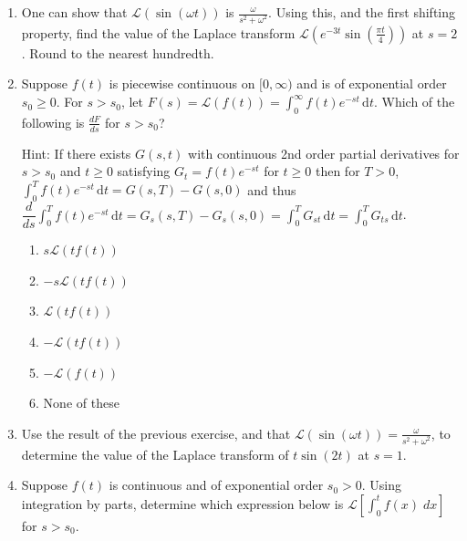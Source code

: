 \documentclass{ximera}
\newcommand{\Laplace}[1]{\ensuremath{\mathcal{L}{\left[#1\right]}}}
\begin{document}
\begin{enumerate}[label=(\arabic*)]
\item  One can show that $\mathcal{L}\left(\sin{(\omega t)}\right)$ is $\displaystyle \frac{\omega}{s^2+\omega^2}$.   Using this, and the first shifting property, find the value of the Laplace transform $\mathcal{L}\left(e^{-3t}\sin{\left(\frac{\pi t}{4}\right)}\right)$ at $s=2$.  Round to the nearest hundredth.


\newpage

\item Suppose $f(t)$ is piecewise continuous on $[0,\infty)$ and is of exponential order $s_0\geq 0$.  For $s>s_0$, let $\displaystyle F(s)=\mathcal{L}(f(t))=\int_0^{\infty} f(t)e^{-st}\,\mathrm{d}t$.   Which of the following is $\displaystyle \frac{dF}{ds}$ for $s>s_0$? 


    Hint:  If there exists $G(s,t)$ with continuous 2nd order partial derivatives for $s>s_0$ and $t\geq 0$ satisfying $G_t=f(t)e^{-st}$ for $t\geq 0$ then for $T>0$, $\displaystyle \int_0^{T} f(t)e^{-st}\,\mathrm{d}t=G(s,T)-G(s,0)$ and thus \\$\displaystyle \dfrac{d}{ds}\displaystyle \int_0^{T} f(t)e^{-st}\,\mathrm{d}t=G_s(s,T)-G_s(s,0)=\int_0^T G_{st}\,\mathrm{d}t=\int_0^T G_{ts}\,\mathrm{d}t$.


\begin{enumerate}[label=(\alph*)]
\item $\displaystyle s\mathcal{L}(tf(t))$
\item $\displaystyle -s\mathcal{L}(tf(t))$
\item $\displaystyle \mathcal{L}(tf(t))$
\item $\displaystyle -\mathcal{L}(tf(t))$ %
\item $\displaystyle -\mathcal{L}(f(t))$
\item None of these
\end{enumerate}



\item  Use the result of the previous exercise, and that $\displaystyle \mathcal{L}\left(\sin{(\omega t)}\right)=\frac{\omega}{s^2+\omega^2}$, to determine the value of the Laplace transform of $t\sin{(2t)}$ at $s=1$.  



\item Suppose $f(t)$ is continuous and of exponential order $s_0>0$.  Using integration by parts, determine which expression below is $\displaystyle \Laplace{\int_0^t f(x)\;dx}$ for $s>s_0$.


\end{enumerate}
\end{document}
